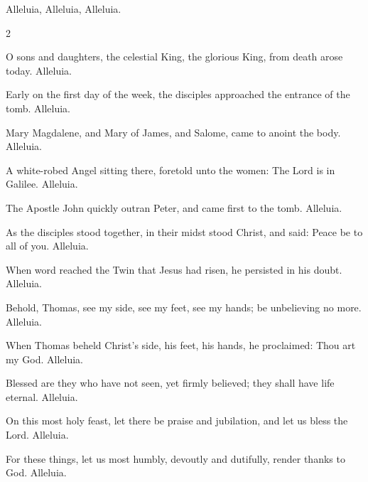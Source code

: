 \begin{enpars} \noindent Alleluia, Alleluia, Alleluia.
\end{enpars}

\begin{multicols}{2}
\raggedcolumns
\begin{enpars}
O sons and daughters, the celestial King, the glorious King,
from death arose today.  Alleluia.

 Early on the first day of the week, the disciples approached the entrance of the tomb.  Alleluia.
     
Mary Magdalene, and Mary of James, and Salome, came to anoint the body. Alleluia.

A white-robed Angel sitting there, foretold unto the women: The Lord is in
Galilee. Alleluia.

The Apostle John quickly outran Peter, and came first to the tomb. Alleluia. 

As the disciples stood together, in their midst stood Christ, and said: Peace be
to all of you. Alleluia.

When word reached the Twin that Jesus had risen, he persisted in his doubt. Alleluia.

Behold, Thomas, see my side, see my feet, see my hands; be unbelieving no more. Alleluia.

When Thomas beheld Christ’s side, his feet, his hands, he proclaimed: Thou
art my God. Alleluia.

Blessed are they who have not seen, yet firmly believed; they shall have life
eternal. Alleluia.

On this most holy feast, let there be praise and jubilation, and let us bless the
Lord. Alleluia.

For these things, let us most humbly, devoutly and dutifully, render thanks to
God. Alleluia.
\end{enpars}\end{multicols}
